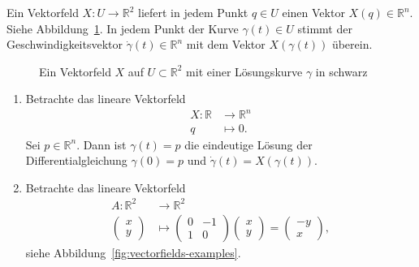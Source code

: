 \documentclass[../main.tex]{subfiles}
\begin{document}
\begin{geometric}
  Ein Vektorfeld $X \colon U \to \mathbb{R}^2$ 
  liefert in jedem Punkt $q \in U$ einen Vektor
  $X(q) \in \mathbb{R}^n$.
  Siehe Abbildung~\ref{fig:vectorfield}.
  In jedem Punkt der Kurve
  $\gamma(t) \in U$ stimmt der Geschwindigkeitsvektor
  $\dot \gamma(t) \in \mathbb{R}^n$ 
  mit dem Vektor $X(\gamma(t))$ überein.
\end{geometric}

\begin{figure}[ht]
    \centering
    \caption{Ein Vektorfeld $X$ auf $U \subset \mathbb{R}^2$
    mit einer Lösungskurve $\gamma$ in schwarz}%
    \label{fig:vectorfield}
\end{figure}

\newpage

\begin{examples}
  \leavevmode
  \begin{enumerate}[(1)]
    \item Betrachte das lineare Vektorfeld
      \begin{align*}
        X \colon \mathbb{R} & \to \mathbb{R}^n \\
        q & \mapsto 0.
      \end{align*}
      Sei $p \in \mathbb{R}^n$. Dann ist $\gamma(t) = p$ 
      die eindeutige
      Lösung der Differentialgleichung $\gamma(0) = p$ 
      und $\dot \gamma(t) = X(\gamma(t))$.
    \item Betrachte das lineare Vektorfeld
      \begin{align*}
        A \colon \mathbb{R}^2 & \to \mathbb{R}^2 \\
        \begin{pmatrix}
          x \\ y
        \end{pmatrix}
         & \mapsto 
         \begin{pmatrix}
           0 & -1 \\ 1 & 0
         \end{pmatrix}
         \begin{pmatrix}
           x \\ y
         \end{pmatrix}
         =
         \begin{pmatrix}
           -y \\ x
         \end{pmatrix},
      \end{align*}
      siehe Abbildung~\ref{fig:vectorfields-examples}.

\end{enumerate}
\end{examples}
\end{document}
